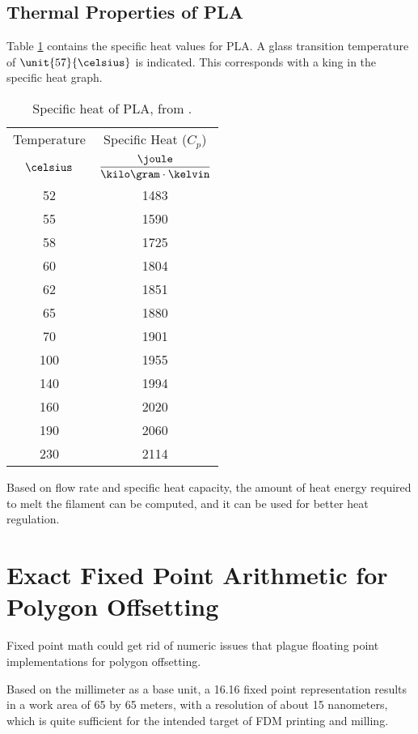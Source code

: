 \documentclass[12pt,a4paper,oneside,openany]{article}
\begin{document}
\subsection{Thermal Properties of PLA}

Table \ref{table:plaheat} contains the specific heat values for PLA. A glass transition temperature of $\unit{57}{\celsius}$ is indicated. This corresponds with a king in the specific heat graph.


\begin{table}[htdp]
\caption{Specific heat of PLA, from \cite{mfr}.}
\begin{center}
\begin{tabular}{cc}
\toprule Temperature & Specific Heat ($C_p$)\\
$\celsius$ & $\dfrac{\joule}{\kilo\gram \cdot \kelvin}$ \\
\midrule 52 & 1483 \\
55 & 1590 \\
58 & 1725 \\
60 & 1804 \\
62 & 1851 \\
65 & 1880 \\
70 & 1901 \\
100 & 1955 \\
140 & 1994 \\
160 & 2020 \\
190 & 2060 \\
230 & 2114 \\
\bottomrule 
\end{tabular}
\end{center}
\label{table:plaheat}
\end{table}%

Based on flow rate and specific heat capacity, the amount of heat energy required to melt the filament can be computed, and it can be used for better heat regulation.

\section{Exact Fixed Point Arithmetic for Polygon Offsetting}

Fixed point math could get rid of numeric issues that plague floating point implementations for polygon offsetting.

Based on the millimeter as a base unit, a 16.16 fixed point representation results in a work area of 65 by 65 meters, with a resolution of about 15 nanometers, which is quite sufficient for the intended target of FDM printing and milling.
\end{document}
